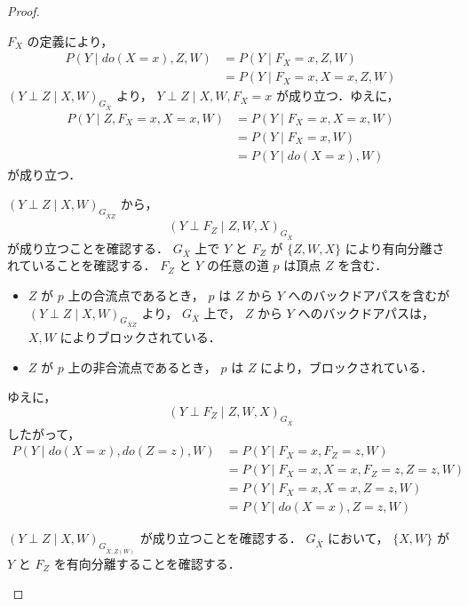 \documentclass[uplatex, dvipdfmx]{jsarticle}
\begin{document}
\begin{proof}
  \begin{enumerate}[label={\textbf{[規則\arabic*]}}, leftmargin=*]
  \item
  $F_X$ の定義により，
  \begin{align}
    P(Y \mid do(X=x), Z, W) &= P(Y \mid F_X=x, Z, W) \\
    &= P(Y \mid F_X=x, X=x, Z, W)
  \end{align}
  $(Y \perp Z \mid X, W)_{G_{\bar{X}}}$ より， $Y \perp Z \mid X, W, F_X=x$ が成り立つ．ゆえに，
  \begin{align}
    P(Y \mid Z, F_X=x, X=x, W) &= P(Y \mid F_X=x, X=x, W) \\
    &= P(Y \mid F_X=x, W) \\
    &= P(Y \mid do(X=x), W)
  \end{align}
  が成り立つ．

  \item $(Y \perp Z \mid X, W)_{G_{\bar{X}\underline{Z}}}$ から，
  \begin{equation}
    (Y \perp F_Z \mid Z, W, X)_{G_{\bar{X}}}
  \end{equation}
  が成り立つことを確認する．
  $G_{\bar{X}}$ 上で $Y$ と $F_Z$ が $\{Z, W, X\}$ により有向分離されていることを確認する．
  $F_Z$ と $Y$ の任意の道 $p$ は頂点 $Z$ を含む．
  \begin{itemize}
    \item $Z$ が $p$ 上の合流点であるとき，
    $p$ は $Z$ から $Y$ へのバックドアパスを含むが $(Y \perp Z \mid X, W)_{G_{\bar{X}\underline{Z}}}$ より， $G_{\bar{X}}$ 上で， $Z$ から $Y$ へのバックドアパスは， $X, W$ によりブロックされている．
    \item $Z$ が $p$ 上の非合流点であるとき，
    $p$ は $Z$ により，ブロックされている．
  \end{itemize}
  ゆえに，
  \begin{equation}
    (Y \perp F_Z \mid Z, W, X)_{G_{\bar{X}}}
  \end{equation}
  したがって，
  \begin{align}
    P(Y \mid do(X=x), do(Z=z), W) &= P(Y \mid F_X=x, F_Z=z, W) \\
    &= P(Y \mid F_X=x, X=x, F_Z=z, Z=z, W) \\
    &= P(Y \mid F_X=x, X=x, Z=z, W) \\
    &= P(Y \mid do(X=x), Z=z, W)
  \end{align}

  \item $(Y \perp Z \mid X, W)_{G_{\bar{X}, \overline{Z(W)}}}$ が成り立つことを確認する．
  $G_{\bar{X}}$ において， $\{X, W\}$ が $Y$ と $F_Z$ を有向分離することを確認する．
  

\end{enumerate}
\end{proof}
\end{document}
